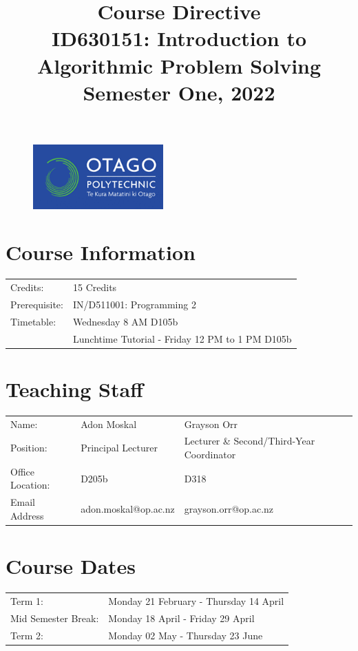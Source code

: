\documentclass{article}
\author{}
\begin{document}
\begin{figure}
	\includegraphics[width=50mm]{../img/logo.png} 
\end{figure}

\title{Course Directive\\ID630151: Introduction to Algorithmic Problem Solving\\Semester One, 2022}
\date{}
\maketitle

\section*{Course Information}
\begin{tabular}{ll}
	Credits:      & 15 Credits                                                             \\
	Prerequisite: & IN/D511001: Programming 2                                                   \\
	Timetable:    & Wednesday 8 AM D105b                   \\
	              & Lunchtime Tutorial - Friday 12 PM to 1 PM D105b  
\end{tabular}

\section*{Teaching Staff}
\begin{tabular}{lll}
	Name:            & Adon Moskal  & Grayson Orr                          \\
	Position:        & Principal Lecturer & Lecturer \& Second/Third-Year Coordinator\\
	Office Location: & D205b & D318                                   \\
	Email Address    & adon.moskal@op.ac.nz & grayson.orr@op.ac.nz                   \\
\end{tabular}

\section*{Course Dates}
\begin{tabular}{ll}
	Term 1:             & Monday 21 February - Thursday 14 April \\
	Mid Semester Break: & Monday 18 April - Friday 29 April      \\
	Term 2:             & Monday 02 May - Thursday 23 June       \\
\end{tabular}
\end{document}
